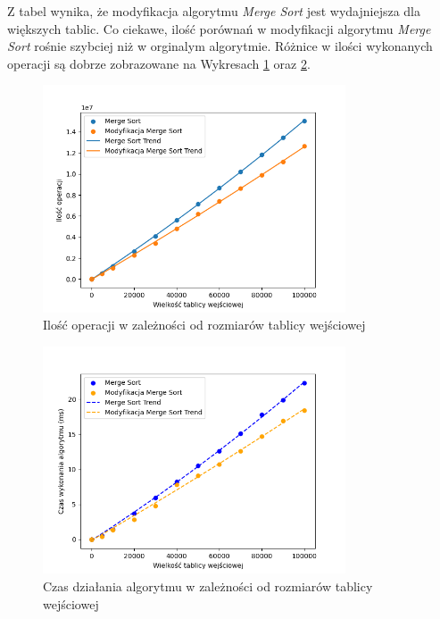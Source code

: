 \documentclass{article}
\begin{document}
Z tabel wynika, że modyfikacja algorytmu \textit{Merge Sort} jest wydajniejsza dla większych tablic. Co ciekawe, ilość porównań w modyfikacji algorytmu \textit{Merge Sort} rośnie szybciej niż w orginalym algorytmie. Różnice w ilości wykonanych operacji są dobrze zobrazowane na Wykresach \ref{fig:merge} oraz \ref{fig:merget}.

\begin{figure}[H]
    \centering
    \includegraphics[width=0.8\textwidth]{Figure_2.png}
    \caption{Ilość operacji w zależności od rozmiarów tablicy wejściowej}
    \label{fig:merge}
\end{figure}
\begin{figure}[H]
    \centering
    \includegraphics[width=0.8\textwidth]{Figure_6.png}
    \caption{Czas działania algorytmu w zależności od rozmiarów tablicy wejściowej}
    \label{fig:merget}
\end{figure}
\end{document}
